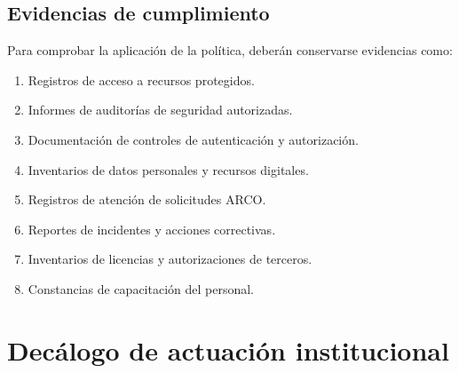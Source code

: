 \documentclass[12pt]{article}
\begin{document}
\subsection{Evidencias de cumplimiento}

Para comprobar la aplicación
de la política, deberán
conservarse evidencias como:

\begin{enumerate}
    \item Registros de acceso
    a recursos protegidos.

    \item Informes de auditorías
    de seguridad autorizadas.

    \item Documentación de controles
    de autenticación y autorización.

    \item Inventarios de datos
    personales y recursos digitales.

    \item Registros de atención
    de solicitudes ARCO.

    \item Reportes de incidentes
    y acciones correctivas.

    \item Inventarios de licencias
    y autorizaciones de terceros.

    \item Constancias de capacitación
    del personal.
\end{enumerate}

\section{Decálogo de actuación institucional}
\end{document}
